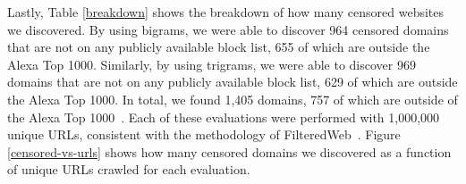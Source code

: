 Lastly, Table \ref{breakdown} shows the breakdown of how many censored
websites we discovered. By using bigrams, we were able to discover 964
censored domains that are not on any publicly available block list,
655 of which are outside the Alexa Top 1000. Similarly, by using
trigrams, we were able to discover 969 domains that are not on any
publicly available block list, 629 of which are outside the Alexa Top
1000. In total, we found 1,405 domains, 757 of which are outside of
the Alexa Top 1000~\cite{alexa:top1000}. Each of these evaluations
were performed with 1,000,000 unique URLs, consistent with the
methodology of FilteredWeb~\cite{darer2017filteredweb}. Figure \ref{censored-vs-urls} shows how
many censored domains we discovered as a function of unique URLs
crawled for each evaluation.

\begin{table}[t]
  \begin{center}
  \end{center}
  \caption{\label{effective-unigrams}Sample of unigrams with
    significant blockrates}
\end{table}

